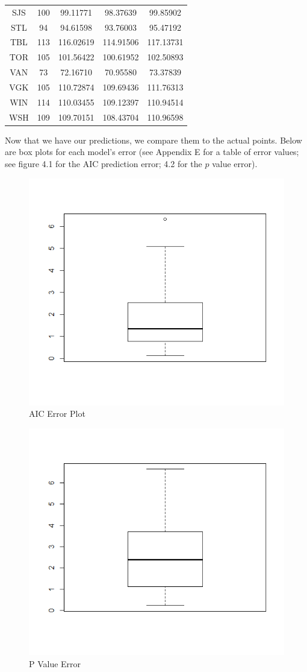 \begin{longtable}{|c|c|c|c|c|}
	SJS & 100 & 99.11771 & 98.37639 & 99.85902 \\
	STL & 94 & 94.61598 & 93.76003 & 95.47192 \\
	TBL & 113 & 116.02619 & 114.91506 & 117.13731 \\
	TOR & 105 & 101.56422 & 100.61952 & 102.50893 \\
	VAN & 73 & 72.16710 & 70.95580 & 73.37839 \\
	VGK & 105 & 110.72874 & 109.69436 & 111.76313 \\
	WIN & 114 & 110.03455 & 109.12397 & 110.94514 \\
	WSH & 109 & 109.70151 & 108.43704 & 110.96598 \\
	\hline
\end{longtable}
\label{tbl:$p$ value Prediction}
Now that we have our predictions, we compare them to the actual points. Below are box plots for each model's error (see Appendix E for a table of error values;
see figure 4.1 for the AIC prediction error; 4.2 for the $p$ value error). \\
\begin{figure}
	\centering
	\includegraphics[width=0.7\linewidth]{AICPredictionError}
	\caption{AIC Error Plot}
	\label{fig:aicpredictionerror}
\end{figure}
\begin{figure}
	\centering
	\includegraphics[width=0.7\linewidth]{pvalueerror}
	\caption{P Value Error}
	\label{fig:pvalueerror}
\end{figure}
